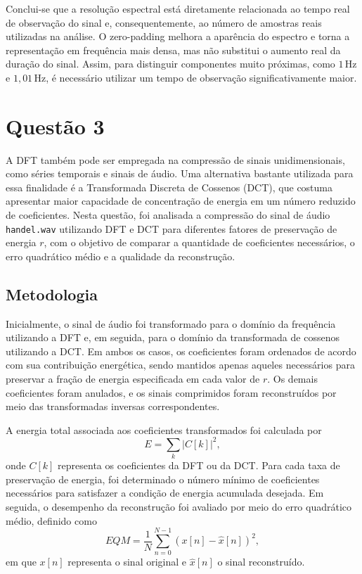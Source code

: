 \documentclass[12pt,a4paper]{article}
\begin{document}
Conclui-se que a resolução espectral está diretamente relacionada ao tempo real de observação do sinal e, consequentemente, ao número de amostras reais utilizadas na análise. O zero-padding melhora a aparência do espectro e torna a representação em frequência mais densa, mas não substitui o aumento real da duração do sinal. Assim, para distinguir componentes muito próximas, como \(1\,\text{Hz}\) e \(1{,}01\,\text{Hz}\), é necessário utilizar um tempo de observação significativamente maior.




\section{Questão 3}

A DFT também pode ser empregada na compressão de sinais unidimensionais, como séries temporais e sinais de áudio. Uma alternativa bastante utilizada para essa finalidade é a Transformada Discreta de Cossenos (DCT), que costuma apresentar maior capacidade de concentração de energia em um número reduzido de coeficientes. Nesta questão, foi analisada a compressão do sinal de áudio \texttt{handel.wav} utilizando DFT e DCT para diferentes fatores de preservação de energia \(r\), com o objetivo de comparar a quantidade de coeficientes necessários, o erro quadrático médio e a qualidade da reconstrução.

\subsection{Metodologia}

Inicialmente, o sinal de áudio foi transformado para o domínio da frequência utilizando a DFT e, em seguida, para o domínio da transformada de cossenos utilizando a DCT. Em ambos os casos, os coeficientes foram ordenados de acordo com sua contribuição energética, sendo mantidos apenas aqueles necessários para preservar a fração de energia especificada em cada valor de \(r\). Os demais coeficientes foram anulados, e os sinais comprimidos foram reconstruídos por meio das transformadas inversas correspondentes.

A energia total associada aos coeficientes transformados foi calculada por
\[
E = \sum_k |C[k]|^2,
\]
onde \(C[k]\) representa os coeficientes da DFT ou da DCT. Para cada taxa de preservação de energia, foi determinado o número mínimo de coeficientes necessários para satisfazer a condição de energia acumulada desejada. Em seguida, o desempenho da reconstrução foi avaliado por meio do erro quadrático médio, definido como
\[
EQM=\frac{1}{N}\sum_{n=0}^{N-1}(x[n]-\hat{x}[n])^2,
\]
em que \(x[n]\) representa o sinal original e \(\hat{x}[n]\) o sinal reconstruído.
\end{document}
